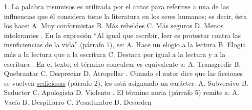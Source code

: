 \documentclass[a4paper,12pt]{article}
\begin{document}
  1. La palabra \underline{ insumisos} es utilizada por el autor para referirse a una de las influencias que él considera tiene la literatura en los seres humanos; es decir, ésta los hace:\newline \newline  
 A. Muy conformistas\newline 
 B. Más rebeldes\newline 
 C. Más seguros\newline 
 D. Menos intolerantes\newline 
 . En la expresión “Al igual que escribir, leer es protestar contra las insuficiencias de la vida” (párrafo 1), se:\newline \newline  
 A. Hace un elogio a la lectura\newline 
 B. Elogia más a la lectura que a la escritura\newline 
 C. Destaca por igual a la lectura y a la escritura \newline 
 . En el texto, el término conculcar es equivalente a:\newline \newline  
 A. Transgredir\newline 
 B. Quebrantar\newline 
 C. Despreciar\newline 
 D. Atropellar\newline 
 . Cuando el autor dice que las ficciones se vuelven \underline{ sediciosas} (párrafo 2), les está asignando un carácter:\newline \newline  
 A. Subversivo\newline 
 B. Seductor\newline 
 C. Apologista\newline 
 D. Violento\newline 
 . El término noria (párrafo 5) remite a:\newline \newline  
 A. Vacío\newline 
 B. Despilfarro\newline 
 C. Pesadumbre\newline 
 D. Desorden\newline 
 \newline 
\end{document}
